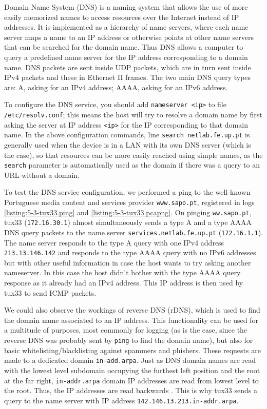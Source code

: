 \documentclass[a4paper, 11pt]{report}
\begin{document}
Domain Name System (DNS) is a naming system that allows the use of more easily memorized names to access resources over the Internet instead of IP addresses.
It is implemented as a hierarchy of name servers, where each name server maps a name to an IP address or otherwise points at other name servers that can be searched for the domain name.
Thus DNS allows a computer to query a predefined name server for the IP address corresponding to a domain name.
DNS packets are sent inside UDP packets, which are in turn sent inside IPv4 packets and these in Ethernet II frames.
The two main DNS query types are: A, asking for an IPv4 address; AAAA, asking for an IPv6 address.

To configure the DNS service, you should add \texttt{nameserver <ip>} to file \texttt{/etc/resolv.conf}; this means the host will try to resolve a domain name by first asking the server at IP address \texttt{<ip>} for the IP corresponding to that domain name.
In the above configuration commands, line \texttt{search netlab.fe.up.pt} is generally used when the device is in a LAN with its own DNS server (which is the case), so that resources can be more easily reached using simple names, as the \texttt{search} parameter is automatically used as the domain if there was a query to an URL without a domain.

To test the DNS service configuration, we performed a ping to the well-known Portuguese media content and services provider \texttt{www.sapo.pt}, registered in logs \ref{listing:5-3-tux33.ping} and \ref{listing:5-3-tux33.pcapng}.
On pinging \texttt{ww.sapo.pt}, tux33 (\texttt{172.16.30.1}) almost simultaneously sends a type A and a type AAAA DNS query packets to the name server \texttt{services.netlab.fe.up.pt} (\texttt{172.16.1.1}).
The name server responds to the type A query with one IPv4 address \texttt{213.13.146.142} and responds to the type AAAA query with no IPv6 addresses but with other useful information in case the host wants to try asking another nameserver.
In this case the host didn't bother with the type AAAA query response as it already had an IPv4 address.
This IP address is then used by tux33 to send ICMP packets.

We could also observe the workings of reverse DNS (rDNS), which is used to find the domain name associated to an IP address.
This functionality can be used for a multitude of purposes, most commonly for logging (as is the case, since the reverse DNS was probably sent by \texttt{ping} to find the domain name), but also for basic whitelisting/blacklisting against spammers and phishers.
These requests are made to a dedicated domain \texttt{in-add.arpa}.
Just as DNS domain names are read with the lowest level subdomain occupying the furthest left position and the root at the far right, \texttt{in-addr.arpa} domain IP addresses are read from lowest level to the root. Thus, the IP addresses are read backwards \cite{in-addr-arpa}.
This is why tux33 sends a query to the name server with IP address \texttt{142.146.13.213.in-addr.arpa}.
\end{document}
